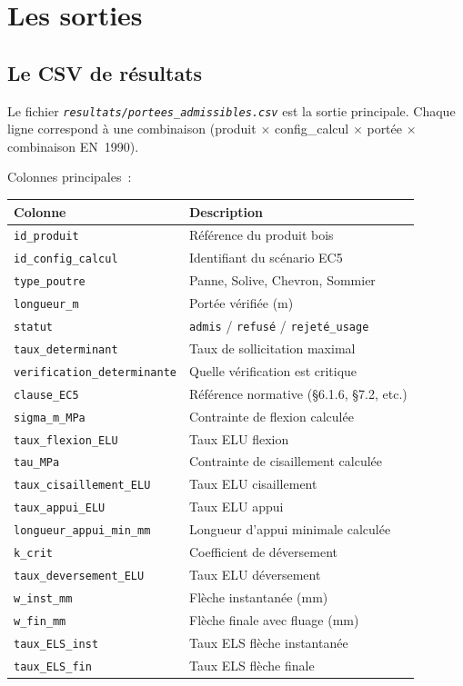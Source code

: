 \documentclass[12pt, a4paper, openany]{book}
\newcommand{\py}[1]{\texttt{#1}}
\newcommand{\fichier}[1]{\texttt{\textit{#1}}}
\begin{document}
\chapter{Les sorties}

\section{Le CSV de r\'esultats}

Le fichier \fichier{resultats/portees\_admissibles.csv} est la sortie principale.
Chaque ligne correspond \`a une combinaison
(produit $\times$ config\_calcul $\times$ port\'ee $\times$ combinaison EN~1990).

Colonnes principales~:

\begin{center}
\begin{tabular}{ll}
\toprule
\textbf{Colonne} & \textbf{Description}\\
\midrule
\py{id\_produit} & R\'ef\'erence du produit bois\\
\py{id\_config\_calcul} & Identifiant du sc\'enario EC5\\
\py{type\_poutre} & Panne, Solive, Chevron, Sommier\\
\py{longueur\_m} & Port\'ee v\'erifi\'ee (m)\\
\py{statut} & \py{admis} / \py{refus\'e} / \py{rejet\'e\_usage}\\
\py{taux\_determinant} & Taux de sollicitation maximal\\
\py{verification\_determinante} & Quelle v\'erification est critique\\
\py{clause\_EC5} & R\'ef\'erence normative (\S{}6.1.6, \S{}7.2, etc.)\\
\py{sigma\_m\_MPa} & Contrainte de flexion calcul\'ee\\
\py{taux\_flexion\_ELU} & Taux ELU flexion\\
\py{tau\_MPa} & Contrainte de cisaillement calcul\'ee\\
\py{taux\_cisaillement\_ELU} & Taux ELU cisaillement\\
\py{taux\_appui\_ELU} & Taux ELU appui\\
\py{longueur\_appui\_min\_mm} & Longueur d'appui minimale calcul\'ee\\
\py{k\_crit} & Coefficient de d\'eversement\\
\py{taux\_deversement\_ELU} & Taux ELU d\'eversement\\
\py{w\_inst\_mm} & Fl\`eche instantan\'ee (mm)\\
\py{w\_fin\_mm} & Fl\`eche finale avec fluage (mm)\\
\py{taux\_ELS\_inst} & Taux ELS fl\`eche instantan\'ee\\
\py{taux\_ELS\_fin} & Taux ELS fl\`eche finale\\
\bottomrule
\end{tabular}
\end{center}
\end{document}
